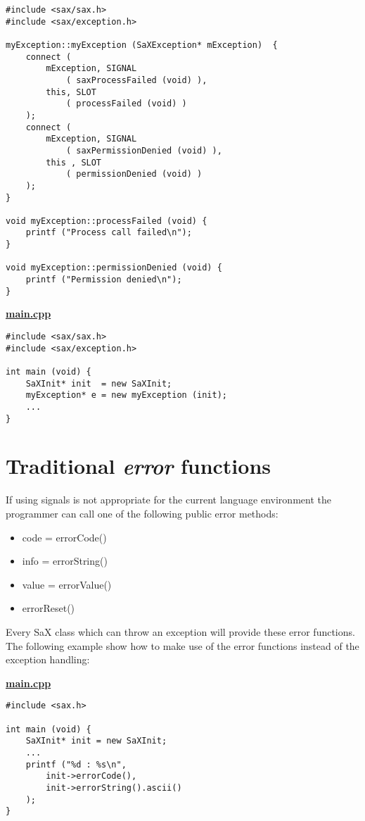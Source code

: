 \begin{Command}{12cm}
\begin{small}
\begin{verbatim}
#include <sax/sax.h>
#include <sax/exception.h>

myException::myException (SaXException* mException)  {
    connect (
        mException, SIGNAL
            ( saxProcessFailed (void) ),
        this, SLOT
            ( processFailed (void) )
    );
    connect (
        mException, SIGNAL
            ( saxPermissionDenied (void) ),
        this , SLOT
            ( permissionDenied (void) )
    );
}

void myException::processFailed (void) {
    printf ("Process call failed\n");
}

void myException::permissionDenied (void) {
    printf ("Permission denied\n");
}
\end{verbatim}
\end{small}
\end{Command}

\textbf{\underline{main.cpp}}

\begin{Command}{12cm}
\begin{small}
\begin{verbatim}
#include <sax/sax.h>
#include <sax/exception.h>

int main (void) {
    SaXInit* init  = new SaXInit;
    myException* e = new myException (init);
    ...
}
\end{verbatim}
\end{small}
\end{Command}

\newpage

\section{Traditional \textit{error} functions}
If using signals is not appropriate for the current language environment
the programmer can call one of the following public error methods:
\begin{itemize}
\item code = errorCode()
\item info = errorString()
\item value = errorValue()
\item errorReset()
\end{itemize}
Every SaX class which can throw an exception will provide these
error functions. The following example show how to make use of the error
functions instead of the exception handling:

\textbf{\underline{main.cpp}}

\begin{Command}{12cm}
\begin{small}
\begin{verbatim}
#include <sax.h>

int main (void) {
    SaXInit* init = new SaXInit;
    ...
    printf ("%d : %s\n",
        init->errorCode(),
        init->errorString().ascii()
    );
}
\end{verbatim}
\end{small}
\end{Command}
